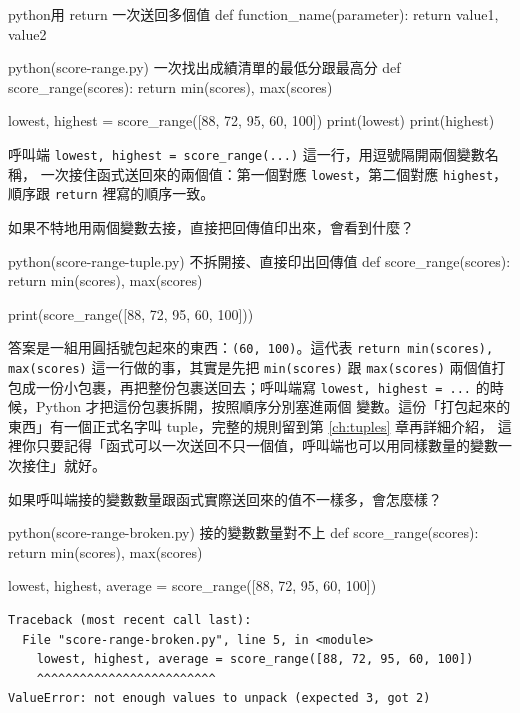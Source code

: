 \begin{code}{python}{用 return 一次送回多個值}
def function_name(parameter):
    return value1, value2
\end{code}

\begin{example}{python}{(score-range.py) 一次找出成績清單的最低分跟最高分}
def score_range(scores):
    return min(scores), max(scores)


lowest, highest = score_range([88, 72, 95, 60, 100])
print(lowest)
print(highest)
\end{example}


呼叫端 \texttt{lowest, highest = score\_range(...)} 這一行，用逗號隔開兩個變數名稱，
一次接住函式送回來的兩個值：第一個對應 \texttt{lowest}，第二個對應 \texttt{highest}，
順序跟 \texttt{return} 裡寫的順序一致。

如果不特地用兩個變數去接，直接把回傳值印出來，會看到什麼？

\begin{example}{python}{(score-range-tuple.py) 不拆開接、直接印出回傳值}
def score_range(scores):
    return min(scores), max(scores)


print(score_range([88, 72, 95, 60, 100]))
\end{example}


答案是一組用圓括號包起來的東西：\texttt{(60, 100)}。這代表
\texttt{return min(scores), max(scores)} 這一行做的事，其實是先把 \texttt{min(scores)}
跟 \texttt{max(scores)} 兩個值打包成一份小包裹，再把整份包裹送回去；呼叫端寫
\texttt{lowest, highest = ...} 的時候，Python 才把這份包裹拆開，按照順序分別塞進兩個
變數。這份「打包起來的東西」有一個正式名字叫 tuple，完整的規則留到第 \ref{ch:tuples} 章再詳細介紹，
這裡你只要記得「函式可以一次送回不只一個值，呼叫端也可以用同樣數量的變數一次接住」就好。

如果呼叫端接的變數數量跟函式實際送回來的值不一樣多，會怎麼樣？

\begin{example}{python}{(score-range-broken.py) 接的變數數量對不上}
def score_range(scores):
    return min(scores), max(scores)


lowest, highest, average = score_range([88, 72, 95, 60, 100])
\end{example}

\begin{verbatim}
Traceback (most recent call last):
  File "score-range-broken.py", line 5, in <module>
    lowest, highest, average = score_range([88, 72, 95, 60, 100])
    ^^^^^^^^^^^^^^^^^^^^^^^^^
ValueError: not enough values to unpack (expected 3, got 2)
\end{verbatim}

